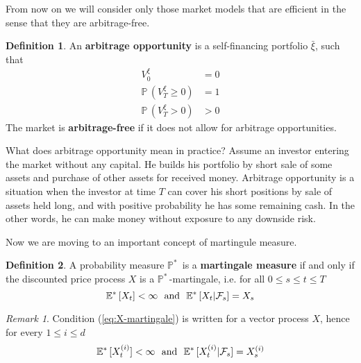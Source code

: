 \documentclass[a4paper,12pt, oneside]{book}
\theoremstyle{definition}
\newtheorem{mydef}{Definition}[chapter]
\theoremstyle{remark}
\newtheorem{remark}{Remark}[chapter]
\def\P{{\mathbb{P}}\,}
\def\Em{{\mathbb{E}^*}\,}
\def\Pm{{\mathbb{P}}^*\,}
\def\xia{\bar{\xi}}
\begin{document}
From now on we will consider only those market models that are efficient in the sense that they are arbitrage-free.
\begin{mydef}
 An \textbf{arbitrage opportunity} is a self-financing portfolio $\xia$, such that
 \begin{align*}
  V^{\xi}_0 &= 0\\
  \P(V^{\xi}_T \geq 0) &= 1\\
  \P(V^{\xi}_T > 0 ) &> 0
 \end{align*}
 The market is \textbf{arbitrage-free} if it does not allow for arbitrage opportunities.
\end{mydef}
What does arbitrage opportunity mean in practice? Assume an investor entering the market without any capital. He builds his portfolio by short sale of some assets and purchase of other assets for received money. Arbitrage opportunity is a situation when the investor at time $T$ can cover his short positions by sale of assets held long, and with positive probability he has some remaining cash.
In the other words, he can make money without exposure to any downside risk. 

Now we are moving to an important concept of martingule measure.
\begin{mydef}
 A probability measure $\Pm$ is a \textbf{martingale measure} if and only if the discounted price process $X$ is a $\Pm$-martingale, i.e. for all  $0 \leq s \leq t \leq T$
 \begin{equation}
  \label{eq:X-martingale}
  \Em[X_t] < \infty \hbox{\ \ and\ \ } \Em[X_t | \mathcal{F}_s] = X_s
 \end{equation}
\end{mydef}

\begin{remark}
 Condition (\ref{eq:X-martingale}) is written for a vector process $X$, hence for every $1 \leq i \leq d$
  \begin{equation*}
  \Em[X^{(i)}_t] < \infty \hbox{\ \ and\ \ } \Em[X^{(i)}_t | \mathcal{F}_s] = X^{(i)}_s
 \end{equation*}
\end{remark}
\end{document}
